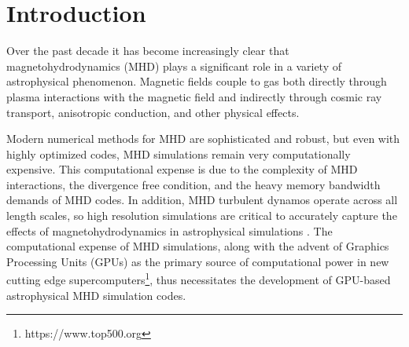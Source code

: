 \section{Introduction}
\label{sec:intro}


Over the past decade it has become increasingly clear that magnetohydrodynamics (MHD) plays a significant role in a variety of astrophysical phenomenon\citep{kobayashi_metallicity_2023, wang_three-dimensional_2023, mori_scale-dependent_2023, werhahn_gamma-ray_2023, zhang_particle_2023, varma_3d_2023, stimpson_numerical_2023, bruggen_2023, yoshida_trajectory_2021, kim_introducing_2023, jones_density_2023, lu_effect_2020,kortgen_shape_2019,galishnikova_tearing_2022, su_stellar_2018,roy_seeding_2023,fielding_how_2017}. Magnetic fields couple to gas both directly through plasma interactions with the magnetic field and indirectly through cosmic ray transport\citep{werhahn_gamma-ray_2023, yoshida_trajectory_2021}, anisotropic conduction\citep{bruggen_2023}, and other physical effects.

Modern numerical methods for MHD are sophisticated and robust, but even with highly optimized codes, MHD simulations remain very computationally expensive\cite{athena++_2020}. This computational expense is due to the complexity of MHD interactions, the divergence free condition, and the heavy memory bandwidth demands of MHD codes\citep{k_athena_2021}. In addition, MHD turbulent dynamos operate across all length scales, so high resolution simulations are critical to accurately capture the effects of magnetohydrodynamics in astrophysical simulations \citep{galishnikova_tearing_2022, pakmor_simulations_2013}. The computational expense of MHD simulations, along with the advent of Graphics Processing Units (GPUs) as the primary source of computational power in new cutting edge supercomputers\footnote{https://www.top500.org}, thus necessitates the development of GPU-based astrophysical MHD simulation codes. 

